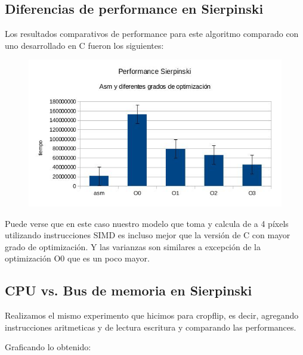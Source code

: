 \documentclass[a4paper]{article}
\begin{document}
\subsection{Diferencias de performance en Sierpinski}

Los resultados comparativos de performance para este algoritmo comparado con uno desarrollado en C fueron los siguientes:

\begin{figure}[h!]
  \begin{center}
  \includegraphics[scale=0.66]{Graficos1.4/sie/per.jpg}
  \label{nombreparareferenciar7}
  \end{center}
\end{figure}

\newpage

Puede verse que en este caso nuestro modelo que toma y calcula de a 4 píxels utilizando instrucciones SIMD es incluso mejor que la versión de C con mayor grado de optimización. Y las varianzas son similares a excepción de la optimización O0 que es un poco mayor.

\newpage
\subsection{CPU vs. Bus de memoria en Sierpinski}

Realizamos el mismo experimento que hicimos para cropflip, es decir, agregando instrucciones aritmeticas y de lectura escritura y comparando las performances.

Graficando lo obtenido:
\end{document}
